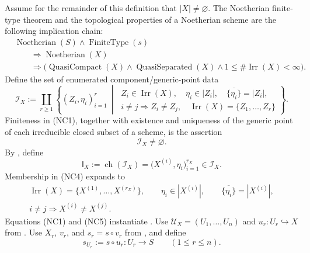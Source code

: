 \begin{definition}
  Assume for the remainder of this definition that $|X|\neq\varnothing$.
  The Noetherian finite-type theorem and the topological properties of a
  Noetherian scheme are the following implication chain:
  \[
  \begin{aligned}
    &\operatorname{Noetherian}(S)\wedge\operatorname{FiniteType}(s)\\
    &\qquad\Longrightarrow \operatorname{Noetherian}(X)\\
    &\qquad\Longrightarrow
      \bigl(\operatorname{QuasiCompact}(X)\wedge
        \operatorname{QuasiSeparated}(X)\wedge
        1\leq\#\operatorname{Irr}(X)<\infty\bigr).
  \end{aligned}                                                     \tag{NC1}
  \]
  Define the set of enumerated component/generic-point data
  \[
    \mathscr I_X:=
      \coprod_{r\geq1}
      \left\{(Z_i,\eta_i)_{i=1}^r\ \middle|\
      \begin{array}{l}
        Z_i\in\operatorname{Irr}(X),\quad
        \eta_i\in|Z_i|,\quad
        \overline{\{\eta_i\}}=|Z_i|,\\
        i\neq j\Longrightarrow Z_i\neq Z_j,\quad
        \operatorname{Irr}(X)=\{Z_1,\ldots,Z_r\}
      \end{array}\right\}.                                      \tag{NC2}
  \]
  Finiteness in (NC1), together with existence and uniqueness of the generic
  point of each irreducible closed subset of a scheme, is the assertion
  \[
    \mathscr I_X\neq\varnothing.                                  \tag{NC3}
  \]
  By , define
  \[
    \mathsf I_X:=\operatorname{ch}(\mathscr I_X)
      =\bigl(X^{(i)},\eta_i\bigr)_{i=1}^{r_X}
      \in\mathscr I_X.                                            \tag{NC4}
  \]
  Membership in (NC4) expands to
  \[
  \begin{gathered}
    \operatorname{Irr}(X)=\{X^{(1)},\ldots,X^{(r_X)}\},\qquad
    \eta_i\in|X^{(i)}|,\qquad
    \overline{\{\eta_i\}}=|X^{(i)}|,\\
    i\neq j\Longrightarrow X^{(i)}\neq X^{(j)}.
  \end{gathered}                                                   \tag{NC5}
  \]
  Equations (NC1) and (NC5) instantiate
  .  Use
  $\mathcal U_X=(U_1,\ldots,U_n)$ and
  $u_r\colon U_r\hookrightarrow X$ from
  .  Use $X_r$, $v_r$, and
  $s_r=s\circ v_r$ from , and define
  \[
    s_{U_r}:=s\circ u_r\colon U_r\to S\qquad(1\leq r\leq n).
\]
\end{definition}
